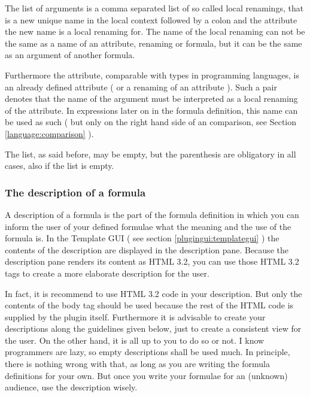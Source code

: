 The list of arguments is a comma separated list of so called local renamings,
that is a new unique name in the local context followed by a colon and the
attribute the new name is a local renaming for. The name of the local renaming can
not be the same as a name of an attribute, renaming or formula, but it can be
the same as an argument of another formula. 

Furthermore the attribute, comparable with types in programming languages, is
an already defined attribute ( or a renaming of an attribute ). Such a pair
 denotes that the name of the argument
must be interpreted as a local renaming of the attribute. In expressions later
on in the formula definition, this name can be used as such ( but only on the
right hand side of an comparison, see Section \ref{language:comparison} ).

The list, as said before, may be empty, but the parenthesis are obligatory in
all cases, also if the list is empty.

\subsubsection{The description of a formula}

A description of a formula is the part of the formula definition in which you
can inform the user of your defined formulae what the meaning and the use of
the formula is. In the Template GUI ( see section \ref{plugingui:templategui} ) the
contents of the description are displayed in the description pane. Because the
description pane renders its content as HTML 3.2, you can use those HTML 3.2
tags to create a more elaborate description for the user.

In fact, it is recommend to use HTML 3.2 code in your description. But only
the contents of the body tag should be used because the rest of the HTML code
is supplied by the plugin itself. Furthermore it is advisable to create your
descriptions along the guidelines given below, just to create a consistent
view for the user. On the other hand, it is all up to you to do so or not. I
know programmers are lazy, so empty descriptions shall be used much. In
principle, there is nothing wrong with that, as long as you are writing the
formula definitions for your own. But once you write your formulae for an
(unknown) audience, use the description wisely.

